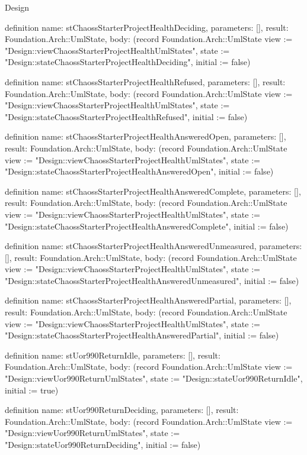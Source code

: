 \begin{lexlean}{Design}
\begin{semanticmodule}
definition{
  name: stChaossStarterProjectHealthDeciding,
  parameters: [],
  result: Foundation.Arch::UmlState,
  body: (record Foundation.Arch::UmlState {view := "Design::viewChaossStarterProjectHealthUmlStates", state := "Design::stateChaossStarterProjectHealthDeciding", initial := false})
}

definition{
  name: stChaossStarterProjectHealthRefused,
  parameters: [],
  result: Foundation.Arch::UmlState,
  body: (record Foundation.Arch::UmlState {view := "Design::viewChaossStarterProjectHealthUmlStates", state := "Design::stateChaossStarterProjectHealthRefused", initial := false})
}

definition{
  name: stChaossStarterProjectHealthAnsweredOpen,
  parameters: [],
  result: Foundation.Arch::UmlState,
  body: (record Foundation.Arch::UmlState {view := "Design::viewChaossStarterProjectHealthUmlStates", state := "Design::stateChaossStarterProjectHealthAnsweredOpen", initial := false})
}

definition{
  name: stChaossStarterProjectHealthAnsweredComplete,
  parameters: [],
  result: Foundation.Arch::UmlState,
  body: (record Foundation.Arch::UmlState {view := "Design::viewChaossStarterProjectHealthUmlStates", state := "Design::stateChaossStarterProjectHealthAnsweredComplete", initial := false})
}

definition{
  name: stChaossStarterProjectHealthAnsweredUnmeasured,
  parameters: [],
  result: Foundation.Arch::UmlState,
  body: (record Foundation.Arch::UmlState {view := "Design::viewChaossStarterProjectHealthUmlStates", state := "Design::stateChaossStarterProjectHealthAnsweredUnmeasured", initial := false})
}

definition{
  name: stChaossStarterProjectHealthAnsweredPartial,
  parameters: [],
  result: Foundation.Arch::UmlState,
  body: (record Foundation.Arch::UmlState {view := "Design::viewChaossStarterProjectHealthUmlStates", state := "Design::stateChaossStarterProjectHealthAnsweredPartial", initial := false})
}

definition{
  name: stUor990ReturnIdle,
  parameters: [],
  result: Foundation.Arch::UmlState,
  body: (record Foundation.Arch::UmlState {view := "Design::viewUor990ReturnUmlStates", state := "Design::stateUor990ReturnIdle", initial := true})
}

definition{
  name: stUor990ReturnDeciding,
  parameters: [],
  result: Foundation.Arch::UmlState,
  body: (record Foundation.Arch::UmlState {view := "Design::viewUor990ReturnUmlStates", state := "Design::stateUor990ReturnDeciding", initial := false})
}


\end{semanticmodule}
\end{lexlean}

